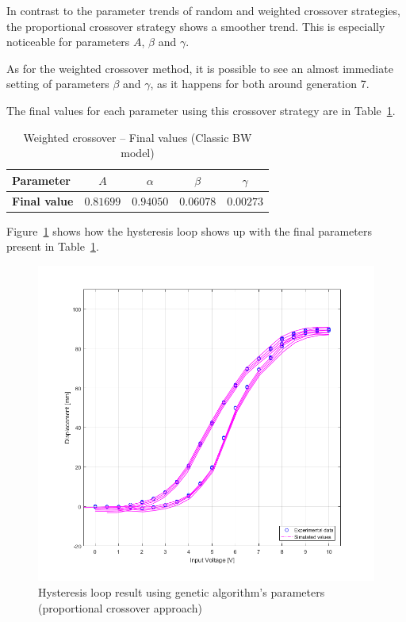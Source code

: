 In contrast to the parameter trends of random and weighted crossover strategies,
the proportional crossover strategy shows a smoother trend. 
This is especially noticeable for parameters $A$, $\beta$ and $\gamma$.

As for the weighted crossover method, it is possible to see an almost
immediate setting of parameters $\beta$ and $\gamma$, as it happens
for both around generation 7.

The final values for each parameter using this crossover strategy
are in Table~\ref{tab:ga_classic_prop_final}.

\begin{table}[H]
	\centering
	\begin{tabular}{l c c c c}
		\toprule
		\textbf{Parameter}		& $A$	& $\alpha$	& $\beta$	& $\gamma$ 	\\ \midrule
		\textbf{Final value}	& $0.81699$	& $0.94050$	& $0.06078$ & $0.00273$	\\ \bottomrule
	\end{tabular}
	\caption{Weighted crossover -- Final values (Classic BW model)}
	\label{tab:ga_classic_prop_final}
\end{table}

Figure~\ref{fig:ga_classic_res} shows how the hysteresis loop shows up
with the final parameters present in Table~\ref{tab:ga_classic_prop_final}.

\begin{figure}[H]
	\centering
	\includegraphics[width=\linewidth]{Images/ga_prop_final}
	\caption{Hysteresis loop result using genetic algorithm's parameters (proportional crossover approach)}
	\label{fig:ga_classic_res}
\end{figure}

